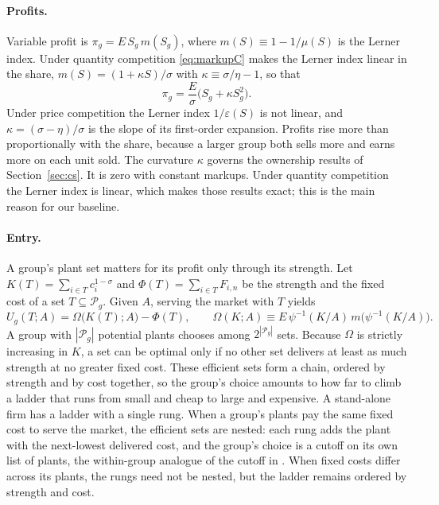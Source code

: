 \documentclass[11pt]{article}
\theoremstyle{definition}
\theoremstyle{remark}
\newcommand{\cP}{\mathcal P}
\begin{document}
\paragraph{Profits.} Variable profit is $\pi_g=E\,S_g\,m(S_g)$, where
$m(S)\equiv1-1/\mu(S)$ is the Lerner index. Under quantity competition
\eqref{eq:markupC} makes the Lerner index linear in the share,
$m(S)=(1+\kappa S)/\sigma$ with $\kappa\equiv\sigma/\eta-1$, so that
\begin{equation}
  \pi_g=\frac{E}{\sigma}\bigl(S_g+\kappa S_g^2\bigr).
  \label{eq:profit}
\end{equation}
Under price competition the Lerner index $1/\varepsilon(S)$ is not linear, and
$\kappa=(\sigma-\eta)/\sigma$ is the slope of its first-order expansion. Profits rise
more than proportionally with the share, because a larger group both sells more and
earns more on each unit sold. The curvature $\kappa$ governs the ownership results of
Section~\ref{sec:cs}. It is zero with constant markups. Under quantity competition the
Lerner index is linear, which makes those results exact; this is the main reason for our
baseline.

\paragraph{Entry.} A group's plant set matters for its profit only through its
strength. Let $K(T)=\sum_{i\in T}c_i^{1-\sigma}$ and $\Phi(T)=\sum_{i\in T}F_{i,n}$ be
the strength and the fixed cost of a set $T\subseteq\cP_g$. Given $A$, serving the
market with $T$ yields
\begin{equation}
  U_g(T;A)=\Omega\bigl(K(T);A\bigr)-\Phi(T),
  \qquad
  \Omega(K;A)\equiv E\,\psi^{-1}(K/A)\,m\bigl(\psi^{-1}(K/A)\bigr).
  \label{eq:entrypayoff}
\end{equation}
A group with $|\cP_g|$ potential plants chooses among $2^{|\cP_g|}$ sets. Because
$\Omega$ is strictly increasing in $K$, a set can be optimal only if no other set
delivers at least as much strength at no greater fixed cost. These efficient sets form
a chain, ordered by strength and by cost together, so the group's choice amounts to how
far to climb a ladder that runs from small and cheap to large and expensive. A
stand-alone firm has a ladder with a single rung. When a group's plants pay the same
fixed cost to serve the market, the efficient sets are nested: each rung adds the plant
with the next-lowest delivered cost, and the group's choice is a cutoff on its own list
of plants, the within-group analogue of the cutoff in \citet{GaubertItskhoki2021}. When
fixed costs differ across its plants, the rungs need not be nested, but the ladder
remains ordered by strength and cost.
\end{document}
